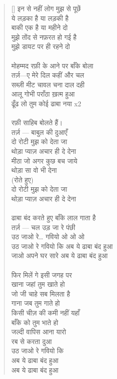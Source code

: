 \begin{verse}[\versewidth]
{इन से नहीं लोग मुझ से पूछें\\
ये लड़का है या लड़की है\\
बाकी एक है या महीने दो\\
मुझे तोंद से नफ़रत हो गई है\\
मुझे डायट पर ही रहने दो\\
\\
मोहम्मद रफ़ी के आने पर बाँके बोला\\
तर्ज़—ए मेरे दिल कहीं और चल\\
सब्ज़ी मीट चावल चना दाल दही\\
आलू गोभी पराँठा ख़त्म हुआ\\
ढूँढ लो तुम कोई ढाबा नया x2\\
\\
रफ़ी साहिब बोलते हैं।\\
तर्ज़ — बाबुल की दुआएँ\\
दो रोटी मुझ को देता जा\\
थोड़ा प्याज़ अचार ही दे देना\\
मीठा जो अगर कुछ बच जाये\\
थोड़ा सा वो भी देना\\
(रोते हुए)\\
दो रोटी मुझ को देता जा\\
थोड़ा प्याज़ अचार ही दे देना\\
\\
ढाबा बंद करते हुए बाँके लाल गाता है\\
तर्ज़ — चल उड़ जा रे पंछी\\
उठ जाओ रे… गवियो ओ ओ ओ\\
उठ जाओ रे गवियो कि अब ये ढाबा बंद हुआ\\
जाओ अपने घर सारे अब ये ढाबा बंद हुआ\\
\\
फिर मिलें गे इसी जगह पर\\
खाना जहां तुम खाते हो\\
जो जी चाहे सब मिलता है\\
गाना जब तुम गाते हो\\
किसी चीज़ की कमी नहीं यहाँ\\
बाँके को तुम भाते हो\\
जल्दी वापिस आना यारो\\
रब से करता दुआ\\
उठ जाओ रे गवियो कि\\
अब ये ढाबा बंद हुआ\\
अब ये ढाबा बंद हुआ
}\end{verse}

